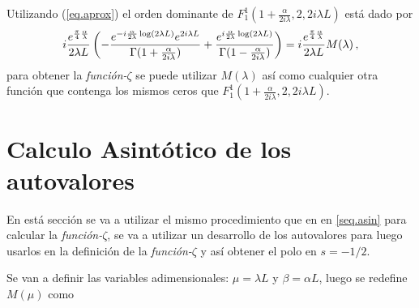 Utilizando (\ref{eq.aprox}) el orden dominante de $F _1 ^1 (1+  \frac{  \alpha}{2 i \lambda} ,2 ,2 i \lambda L  )$ está dado por
\begin{equation}
    i  \frac{e ^{ \frac{\pi}{4} \frac{\alpha}{\lambda} } }{2 \lambda L}
    \left( -
    \frac{e ^{- i \frac{\alpha}{2 \lambda}  \log (2 \lambda L) } e ^{2 i \lambda L} }{\Gamma(1+\frac{ \alpha}{2 i \lambda})} +
    \frac{e ^{  i \frac{\alpha}{2 \lambda}  \log (2 \lambda L) }}               {\Gamma(1-\frac{ \alpha}{2 i \lambda})}
    \right) \\[5pt]  
    =  i  \frac{e ^{ \frac{\pi}{4} \frac{\alpha}{\lambda} } }{2 \lambda L}     M (\lambda) 
    \, ,
\label{eq.completa}
\end{equation}
para obtener la {\it función-$\zeta $} se puede utilizar $M( \lambda)$ así  como cualquier otra función que contenga los mismos ceros que $F _1 ^1 (1+  \frac{  \alpha}{2 i \lambda} ,2 ,2 i \lambda L  )$.



\section{Calculo Asintótico de los autovalores}


En está sección se va a utilizar el mismo procedimiento que en en \ref{seq.asin} para calcular la {\it función-$\zeta$}, se va a utilizar un desarrollo de los autovalores para luego usarlos en la definición de la {\it función-$\zeta$} y así obtener el polo en $s=-1/2$.

Se van a definir las variables adimensionales: $\mu = \lambda L $ y $\beta = \alpha L$, luego se redefine $M (\mu)$ como

